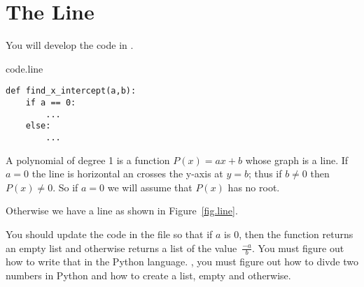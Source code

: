 \section{The Line}
\label{sec.line}

You will develop the code in .

\begin{listing}{}{code.line}
\begin{minipage}[c]{0.95\textwidth}\begin{lstlisting}
def find_x_intercept(a,b):
    if a == 0:
        ...
    else:
        ...
\end{lstlisting}\end{minipage}\end{listing}





A polynomial of degree 1 is a function $P(x)=a x + b$ whose graph is a line.   If $a=0$ the
line is horizontal an crosses the y-axis at $y=b$; thus if $b\neq 0$ then $P(x)\neq 0$.
So if $a=0$ we will assume that $P(x)$ has no root.   

Otherwise we have a line as shown in Figure~\ref{fig.line}.


You should update the code in the file  so that if
$a$ is 0, then the function returns an empty list and otherwise
returns a list of the value~$\frac{-a}{b}$.  You must figure out how
to write that in the Python language.  \Ie, you must figure out how to
divde two numbers in Python and how to create a list, empty and
otherwise.


